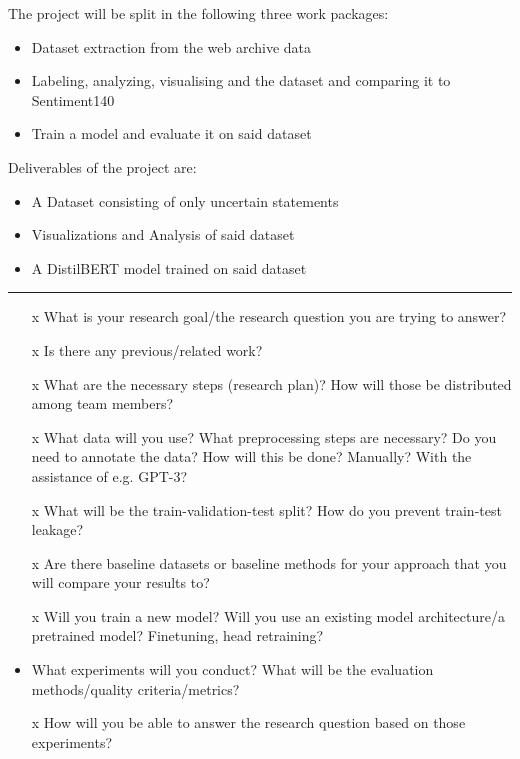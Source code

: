 \documentclass[a4paper,12pt,numbers=enddot]{scrartcl}
\begin{document}
The project will be split in the following three work packages:
\begin{itemize}
	\setlength\itemsep{-5pt}
	\item Dataset extraction from the web archive data
	\item Labeling, analyzing, visualising and the dataset and comparing it to Sentiment140
	\item Train a model and evaluate it on said dataset
\end{itemize}

Deliverables of the project are:
\begin{itemize}
	\setlength\itemsep{-5pt}
	\item A Dataset consisting of only uncertain statements
	\item Visualizations and Analysis of said dataset
	\item A DistilBERT model trained on said dataset
\end{itemize}
\medskip

\hrule
\vspace{-2.5em}
\renewcommand{\refname}{}
\nocite{*}


\clearpage

\begin{itemize}
	\setlength\itemsep{-5pt}
	\item[x] What is your research goal/the research question you are trying to answer?
	\item[x] Is there any previous/related work?
	\item[x] What are the necessary steps (research plan)? How will those be distributed among 	team members?
	\item[x] What data will you use? What preprocessing steps are necessary? Do you need to annotate the data? How will this be done? Manually? With the assistance of e.g. GPT-3?
	\item[x] What will be the train-validation-test split? How do you prevent train-test leakage?
	\item[x] Are there baseline datasets or baseline methods for your approach that you will compare your results to?
	\item[x] Will you train a new model? Will you use an existing model architecture/a pretrained model? Finetuning, head retraining?
	\item What experiments will you conduct? What will be the evaluation methods/quality criteria/metrics?
	\item[x] How will you be able to answer the research question based on those experiments?
\end{itemize}
\end{document}
